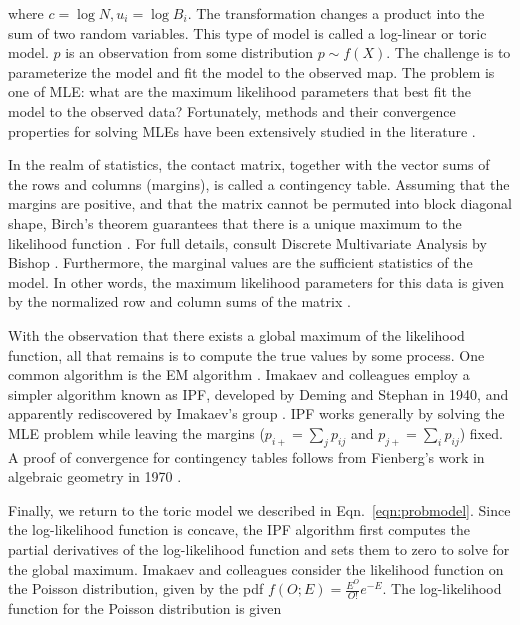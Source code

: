 where $c = \log{N}, u_i = \log{B_i}$.  The transformation changes a product into the sum of two random variables.  This type of
model is called a \gls{log-linear} or \gls{toric model}.  $p$ is an observation from some distribution $p \sim f(X)$.  The challenge is to
parameterize the model and fit the model to the observed map.  The problem is one of \gls{MLE}: what are the maximum likelihood parameters
that best fit the model to the observed data?  Fortunately, methods and their convergence properties for solving \glspl{MLE} have been extensively
studied in the literature \citep{pachter2005,fienberg2012}.

In the realm of statistics, the contact matrix, together with the vector sums of the rows and columns (margins), is called a \gls{contingency table}.  Assuming
that the margins are positive, and that the matrix cannot be permuted into block diagonal shape, Birch's theorem guarantees that there is a
unique maximum to the likelihood function \citep{bishop1975, pachter2005}.  For full details, consult Discrete Multivariate Analysis by
Bishop \citep{bishop1975}.  Furthermore, the marginal values are the \glspl{sufficient statistic} of the model.  In other words, the maximum
likelihood parameters for this data is given by the normalized row and column sums of the matrix \citep{pachter2005}.

With the observation that there exists a global maximum of the likelihood function, all that remains is to compute the true values by some
process.  One common algorithm is the \gls{EM} algorithm \citep{fuchs1982}.  Imakaev and colleagues employ a simpler algorithm known as \gls{IPF},
developed by Deming and Stephan in 1940, and apparently rediscovered by Imakaev's group \citep{deming1940}.  \gls{IPF} works generally by solving
the \gls{MLE} problem while leaving the margins ($p_{i+} = \sum_{j}p_{ij}$ and $p_{j+} = \sum_{i}p_{ij}$) fixed.  A proof of convergence for contingency
tables follows from Fienberg's work in algebraic geometry in 1970 \citep{fienberg1970}.

Finally, we return to the \gls{toric model} we described in Eqn.~\eqref{eqn:probmodel}.  Since the log-likelihood function is concave, the \gls{IPF}
algorithm first computes the partial derivatives of the log-likelihood function and sets them to zero to solve for the global maximum.  Imakaev
and colleagues consider the likelihood function on the Poisson distribution, given by the \gls{pdf} $f(O;E) = \frac{E^{O}}{O!}e^{-E}$.  The
log-likelihood function for the Poisson distribution is given

